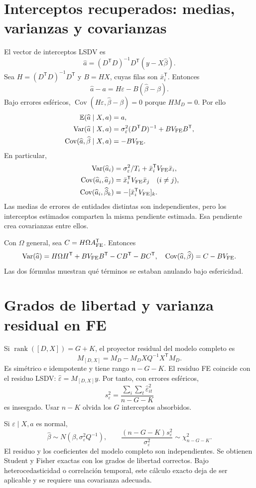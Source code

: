 \documentclass[11pt,a4paper]{article}
\newcommand{\E}{\mathbb E}
\newcommand{\T}{^{\mathsf T}}
\DeclareMathOperator{\Var}{Var}
\DeclareMathOperator{\Cov}{Cov}
\DeclareMathOperator{\rank}{rank}
\theoremstyle{definition}
\newcommand{\eps}{\varepsilon}
\begin{document}
\section{Interceptos recuperados: medias, varianzas y covarianzas}
El vector de interceptos LSDV es
\[
\widehat a=(D\T D)^{-1}D\T(y-X\widehat\beta).
\]
Sea $H=(D\T D)^{-1}D\T$ y $B=HX$, cuyas filas son $\bar x_i\T$.
Entonces
\[
\widehat a-a=H\eps-B(\widehat\beta-\beta).
\]
Bajo errores esféricos, $\Cov(H\eps,\widehat\beta-\beta)=0$ porque
$HM_D=0$. Por ello
\[
\begin{aligned}
\E(\widehat a\mid X,a)&=a,\\
\Var(\widehat a\mid X,a)&=\sigma_\eps^2(D\T D)^{-1}+BV_{\rm FE}B\T,\\
\Cov(\widehat a,\widehat\beta\mid X,a)&=-BV_{\rm FE}.
\end{aligned}
\]
En particular,
\[
\begin{aligned}
\Var(\widehat a_i)&=\sigma_\eps^2/T_i+\bar x_i\T V_{\rm FE}\bar x_i,\\
\Cov(\widehat a_i,\widehat a_j)&=\bar x_i\T V_{\rm FE}\bar x_j\quad(i\ne j),\\
\Cov(\widehat a_i,\widehat\beta_k)&=-[\bar x_i\T V_{\rm FE}]_k.
\end{aligned}
\]
Las medias de errores de entidades distintas son independientes, pero los interceptos estimados comparten la misma pendiente estimada. Esa pendiente crea covarianzas entre ellos.

Con $\Omega$ general, sea $C=H\Omega A_{\rm FE}\T$.
Entonces
\[
\Var(\widehat a)=H\Omega H\T+BV_{\rm FE}B\T-CB\T-BC\T,
\quad
\Cov(\widehat a,\widehat\beta)=C-BV_{\rm FE}.
\]
Las dos fórmulas muestran qué términos se estaban anulando bajo esfericidad.

\section{Grados de libertad y varianza residual en FE}
Si $\rank([D,X])=G+K$, el proyector residual del modelo completo es
\[
M_{[D,X]}=M_D-M_DXQ^{-1}X\T M_D.
\]
Es simétrico e idempotente y tiene rango $n-G-K$. El residuo FE coincide con el residuo LSDV:
$\widehat\eps=M_{[D,X]}y$.
Por tanto, con errores esféricos,
\[
s_\eps^2=\frac{\sum_i\sum_t\widehat\eps_{it}^2}{n-G-K}
\]
es insesgado. Usar $n-K$ olvida los $G$ interceptos absorbidos.

Si $\eps\mid X,a$ es normal,
\[
\widehat\beta\sim N(\beta,\sigma_\eps^2Q^{-1}),\qquad
\frac{(n-G-K)s_\eps^2}{\sigma_\eps^2}\sim\chi_{n-G-K}^2.
\]
El residuo y los coeficientes del modelo completo son independientes. Se obtienen Student y Fisher exactas con los grados de libertad correctos. Bajo heterocedasticidad o correlación temporal, este cálculo exacto deja de ser aplicable y se requiere una covarianza adecuada.
\end{document}
